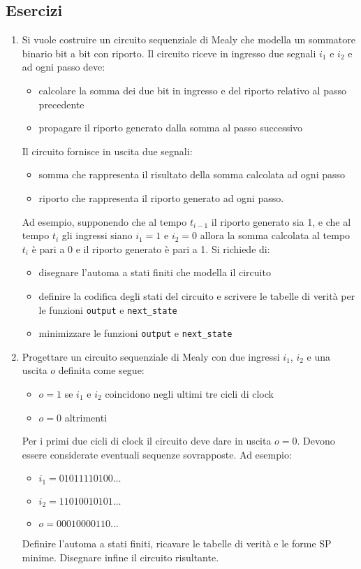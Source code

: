 \documentclass{article}
\begin{document}
\subsection{Esercizi}
\begin{enumerate}
    \item Si vuole costruire un circuito sequenziale di Mealy che modella un sommatore binario bit a bit con riporto. Il circuito riceve in ingresso due segnali $i_1$ e $i_2$ e ad ogni passo deve:
    \begin{itemize}
        \item calcolare la somma dei due bit in ingresso e del riporto relativo al passo precedente
        \item propagare il riporto generato dalla somma al passo successivo
    \end{itemize}
    Il circuito fornisce in uscita due segnali:
    \begin{itemize}
        \item somma che rappresenta il risultato della somma calcolata ad ogni passo
        \item riporto che rappresenta il riporto generato ad ogni passo.
    \end{itemize}
    Ad esempio, supponendo che al tempo $t_{i-1}$ il riporto generato sia 1, e che al tempo $t_i$ gli ingressi siano $i_1 = 1$ e $i_2 = 0$ allora la somma calcolata al tempo $t_i$ è pari a 0 e il riporto generato è pari a 1. Si richiede di:
    \begin{itemize}
        \item disegnare l’automa a stati finiti che modella il circuito
        \item definire la codifica degli stati del circuito e scrivere le tabelle di verità per le funzioni \texttt{output} e \texttt{next\_state}
        \item minimizzare le funzioni \texttt{output} e \texttt{next\_state}
    \end{itemize}
    
    \item Progettare un circuito sequenziale di Mealy con due ingressi $i_1$, $i_2$ e una uscita $o$ definita come segue:
    \begin{itemize}
        \item $o = 1$ se $i_1$ e $i_2$ coincidono negli ultimi tre cicli di clock
        \item $o = 0$ altrimenti
    \end{itemize}
    Per i primi due cicli di clock il circuito deve dare in uscita $o=0$. Devono essere considerate eventuali sequenze sovrapposte. Ad esempio:
    \begin{itemize}
        \item $i_1= 01011110100 \dots$
        \item $i_2= 11010010101 \dots$
        \item $o= 00010000110 \dots$
    \end{itemize}
    Definire l’automa a stati finiti, ricavare le tabelle di verità e le forme SP minime. Disegnare infine il circuito risultante.
    

\end{enumerate}
\end{document}
